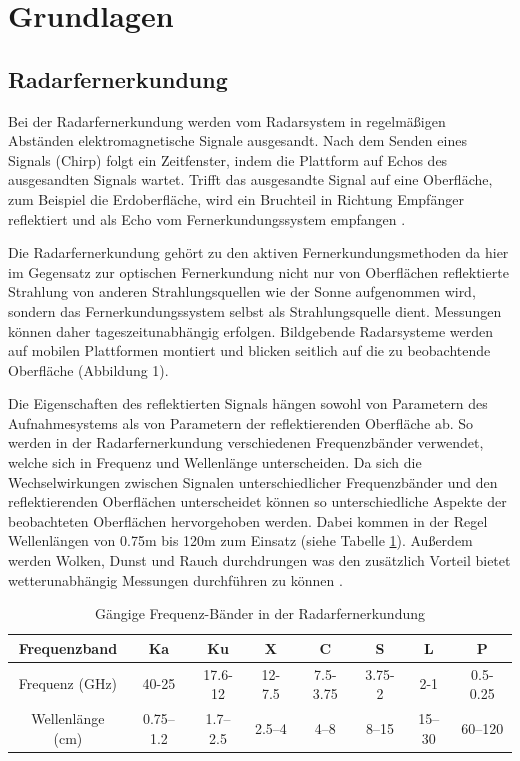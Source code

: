 \newpage
\restoregeometry
\section{Grundlagen}
\subsection{Radarfernerkundung}
Bei der Radarfernerkundung werden vom Radarsystem in regelmäßigen Abständen elektromagnetische Signale ausgesandt. Nach dem Senden eines Signals 
(Chirp) folgt ein Zeitfenster, indem die Plattform auf Echos des ausgesandten Signals wartet.
Trifft das ausgesandte Signal auf eine Oberfläche, zum Beispiel 
die Erdoberfläche, wird ein Bruchteil in Richtung Empfänger reflektiert und als Echo vom Fernerkundungssystem empfangen \cite{tutorial_on_sar}.

Die Radarfernerkundung gehört zu den aktiven Fernerkundungsmethoden da hier im Gegensatz zur optischen Fernerkundung nicht nur 
von Oberflächen reflektierte Strahlung von anderen Strahlungsquellen wie der Sonne aufgenommen wird, sondern das Fernerkundungssystem 
selbst als Strahlungsquelle dient. Messungen können daher tageszeitunabhängig erfolgen. Bildgebende Radarsysteme werden auf mobilen Plattformen 
montiert und blicken seitlich auf die zu beobachtende Oberfläche \cite{tutorial_on_sar} (Abbildung 1). 

Die Eigenschaften des reflektierten Signals hängen sowohl von Parametern des Aufnahmesystems als von Parametern der reflektierenden Oberfläche ab.
So werden in der Radarfernerkundung verschiedenen Frequenzbänder verwendet, welche sich in Frequenz und Wellenlänge unterscheiden. Da sich die Wechselwirkungen zwischen Signalen 
unterschiedlicher Frequenzbänder und den reflektierenden Oberflächen unterscheidet können so unterschiedliche Aspekte der beobachteten Oberflächen hervorgehoben werden. 
Dabei kommen in der Regel Wellenlängen von 0.75m bis 120m zum Einsatz (siehe Tabelle \ref{frequenzbaender}).
Außerdem werden Wolken, Dunst und Rauch durchdrungen was den zusätzlich Vorteil bietet wetterunabhängig Messungen durchführen zu können \cite{einfuehrung_in_fernerkundung}.

\begin{table}[H]
    \caption{Gängige Frequenz-Bänder in der Radarfernerkundung \cite{tutorial_on_sar}}
    \centering
    \begin{tabular}{c|c c c c c c c } 
        Frequenzband & Ka & Ku & X & C & S & L & P\\ 
        \hline
        Frequenz (GHz) & 40-25 & 17.6-12 & 12-7.5 & 7.5-3.75 & 3.75-2 & 2-1 & 0.5-0.25\\ 
        Wellenlänge (cm) & 0.75–1.2 & 1.7–2.5 & 2.5–4 & 4–8 & 8–15 & 15–30 & 60–120\\ 
    \end{tabular}
    \label{frequenzbaender}
\end{table}

